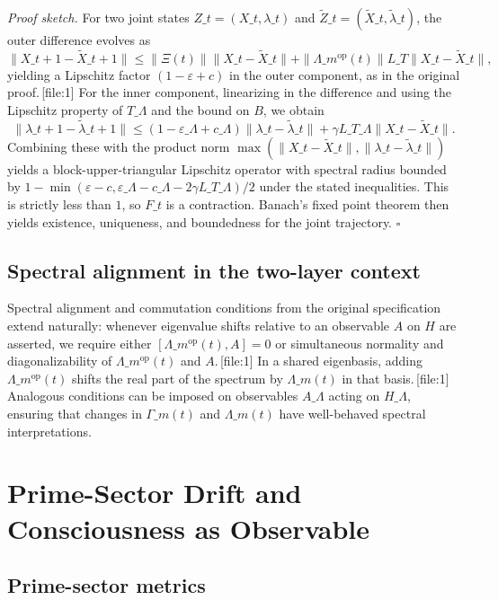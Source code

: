 \documentclass[11pt]{article}
\begin{document}
\medskip
\noindent\emph{Proof sketch.} For two joint states $Z\_t=(X\_t,\lambda\_t)$ and $\tilde{Z}\_t=(\tilde{X}\_t,\tilde{\lambda}\_t)$, the outer difference evolves as
\[
\|X\_{t+1}-\tilde{X}\_{t+1}\| \le \|\Xi(t)\|\|X\_t-\tilde{X}\_t\| + \|\Lambda\_m^{\mathrm{op}}(t)\| L\_T\|X\_t-\tilde{X}\_t\|,
\]
yielding a Lipschitz factor $(1-\varepsilon+c)$ in the outer component, as in the original proof.\,[file:1] For the inner component, linearizing in the difference and using the Lipschitz property of $T\_\Lambda$ and the bound on $B$, we obtain
\[
\|\lambda\_{t+1}-\tilde{\lambda}\_{t+1}\| \le (1-\varepsilon\_\Lambda + c\_\Lambda)\|\lambda\_t-\tilde{\lambda}\_t\| + \gamma L\_{T\_\Lambda} \|X\_t-\tilde{X}\_t\|.
\]
Combining these with the product norm $\max(\|X\_t-\tilde{X}\_t\|,\|\lambda\_t-\tilde{\lambda}\_t\|)$ yields a block-upper-triangular Lipschitz operator with spectral radius bounded by $1-\min(\varepsilon-c,\varepsilon\_\Lambda-c\_\Lambda-2\gamma L\_{T\_\Lambda})/2$ under the stated inequalities. This is strictly less than $1$, so $F\_t$ is a contraction. Banach's fixed point theorem then yields existence, uniqueness, and boundedness for the joint trajectory. \hfill$\square$

\subsection{Spectral alignment in the two-layer context}

Spectral alignment and commutation conditions from the original specification extend naturally: whenever eigenvalue shifts relative to an observable $A$ on $H$ are asserted, we require either $[\Lambda\_m^{\mathrm{op}}(t),A]=0$ or simultaneous normality and diagonalizability of $\Lambda\_m^{\mathrm{op}}(t)$ and $A$.\,[file:1] In a shared eigenbasis, adding $\Lambda\_m^{\mathrm{op}}(t)$ shifts the real part of the spectrum by $\Lambda\_m(t)$ in that basis.\,[file:1] Analogous conditions can be imposed on observables $A\_\Lambda$ acting on $H\_\Lambda$, ensuring that changes in $\Gamma\_m(t)$ and $\Lambda\_m(t)$ have well-behaved spectral interpretations.

\section{Prime-Sector Drift and Consciousness as Observable}

\subsection{Prime-sector metrics}
\end{document}
